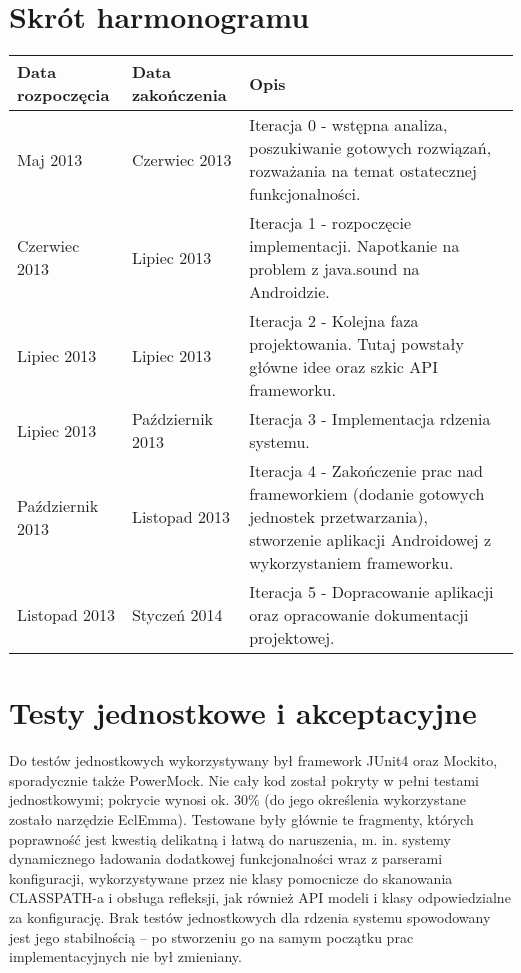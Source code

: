 \section{Skrót harmonogramu}
\begin{center}
    \begin{tabular}{| l | l | p{9cm} |}
    \hline
    Data rozpoczęcia & Data zakończenia & Opis \\ \hline
    Maj 2013 & Czerwiec 2013 & Iteracja 0 - wstępna analiza, poszukiwanie gotowych rozwiązań, rozważania na temat ostatecznej funkcjonalności. \\ \hline
    Czerwiec 2013 & Lipiec 2013 & Iteracja 1 - rozpoczęcie implementacji. Napotkanie na problem z java.sound na Androidzie. \\ \hline
    Lipiec 2013 & Lipiec 2013 & Iteracja 2 - Kolejna faza projektowania. Tutaj powstały główne idee oraz szkic API frameworku.  \\ \hline
    Lipiec 2013 & Październik 2013 & Iteracja 3 - Implementacja rdzenia systemu. \\ \hline
    Październik 2013 & Listopad 2013 & Iteracja 4 - Zakończenie prac nad frameworkiem (dodanie gotowych jednostek przetwarzania), stworzenie aplikacji Androidowej z wykorzystaniem frameworku. \\ \hline
    Listopad 2013 & Styczeń 2014 & Iteracja 5 - Dopracowanie aplikacji oraz opracowanie dokumentacji projektowej. \\ \hline
    \end{tabular}
\end{center}
\section{Testy jednostkowe i akceptacyjne}

Do testów jednostkowych wykorzystywany był framework JUnit4 oraz Mockito, sporadycznie także
PowerMock. Nie cały kod został pokryty w pełni testami jednostkowymi; pokrycie wynosi ok. 30\% (do
jego określenia wykorzystane zostało narzędzie EclEmma). Testowane były głównie te fragmenty,
których poprawność jest kwestią delikatną i łatwą do naruszenia, m. in. systemy dynamicznego
ładowania dodatkowej funkcjonalności wraz z parserami konfiguracji, wykorzystywane przez nie klasy
pomocnicze do skanowania CLASSPATH-a i obsługa refleksji, jak również API modeli i klasy
odpowiedzialne za konfigurację. Brak testów jednostkowych dla rdzenia systemu spowodowany jest jego
stabilnością -- po stworzeniu go na samym początku prac implementacyjnych nie był zmieniany.


